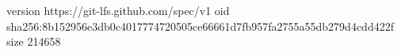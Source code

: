 version https://git-lfs.github.com/spec/v1
oid sha256:8b152956e3db0c4017774720505ce66661d7fb957fa2755a55db279d4cdd422f
size 214658
